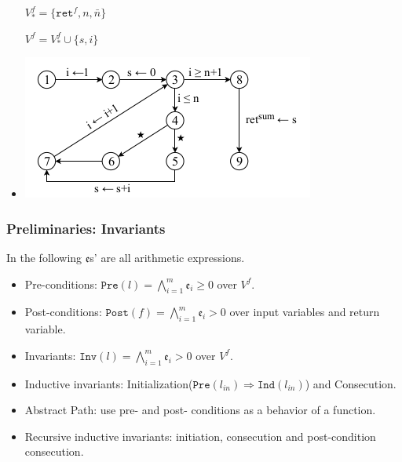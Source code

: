 \documentclass[11pt]{beamer}
\begin{document}
\begin{frame}
\begin{example}
\begin{multicols}{2}
\begin{itemize}
$V_*^f = \{\texttt{ret}^f, n, \bar{n}\}$

$V^f =V_*^f \cup \{s, i\}$

\item 
\includegraphics[scale=0.4]{example2cfg.png}

\end{itemize}

\end{multicols}

\end{example}
\end{frame}

\begin{frame}\frametitle{Preliminaries: Invariants}
In the following $\mathfrak{e}$s' are all arithmetic expressions.
\begin{itemize}
\item Pre-conditions: $\texttt{Pre}(l) = \bigwedge_{i = 1}^m \mathfrak{e}_i \ge 0$ over $V^f$.
\item Post-conditions: $\texttt{Post}(f) = \bigwedge_{i = 1}^m \mathfrak{e}_i > 0$ over input variables and return variable.
\item Invariants: $\texttt{Inv}(l) = \bigwedge_{i = 1}^m \mathfrak{e}_i > 0$ over $V^f$.
\item Inductive invariants: Initialization($\texttt{Pre}(l_{in})\Rightarrow \texttt{Ind}(l_{in})$)  and Consecution.
\item Abstract Path: use pre- and post- conditions  as a behavior of a function.

\item Recursive inductive invariants:  initiation, consecution and post-condition consecution.
\end{itemize}


\end{frame}	
\end{document}
